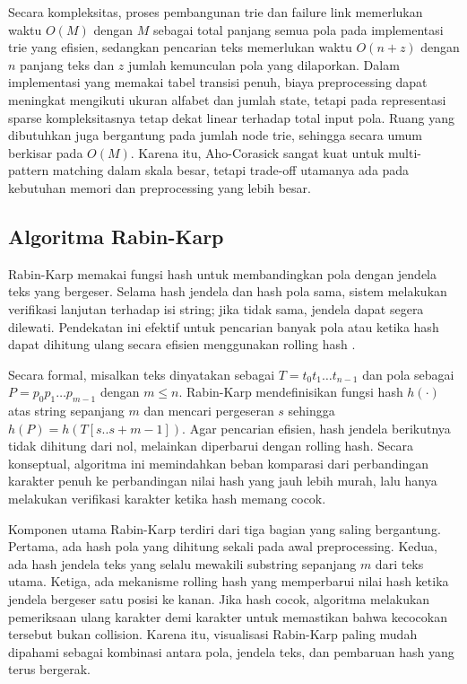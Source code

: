 Secara kompleksitas, proses pembangunan trie dan failure link memerlukan waktu $O(M)$ dengan $M$ sebagai total panjang semua pola pada implementasi trie yang efisien, sedangkan pencarian teks memerlukan waktu $O(n + z)$ dengan $n$ panjang teks dan $z$ jumlah kemunculan pola yang dilaporkan. Dalam implementasi yang memakai tabel transisi penuh, biaya preprocessing dapat meningkat mengikuti ukuran alfabet dan jumlah state, tetapi pada representasi sparse kompleksitasnya tetap dekat linear terhadap total input pola. Ruang yang dibutuhkan juga bergantung pada jumlah node trie, sehingga secara umum berkisar pada $O(M)$. Karena itu, Aho-Corasick sangat kuat untuk multi-pattern matching dalam skala besar, tetapi trade-off utamanya ada pada kebutuhan memori dan preprocessing yang lebih besar.

\subsection{Algoritma Rabin-Karp}

Rabin-Karp memakai fungsi hash untuk membandingkan pola dengan jendela teks yang bergeser. Selama hash jendela dan hash pola sama, sistem melakukan verifikasi lanjutan terhadap isi string; jika tidak sama, jendela dapat segera dilewati. Pendekatan ini efektif untuk pencarian banyak pola atau ketika hash dapat dihitung ulang secara efisien menggunakan rolling hash \cite{karp1987efficient}.

Secara formal, misalkan teks dinyatakan sebagai $T = t_0 t_1 \dots t_{n-1}$ dan pola sebagai $P = p_0 p_1 \dots p_{m-1}$ dengan $m \leq n$. Rabin-Karp mendefinisikan fungsi hash $h(\cdot)$ atas string sepanjang $m$ dan mencari pergeseran $s$ sehingga $h(P) = h(T[s..s+m-1])$. Agar pencarian efisien, hash jendela berikutnya tidak dihitung dari nol, melainkan diperbarui dengan rolling hash. Secara konseptual, algoritma ini memindahkan beban komparasi dari perbandingan karakter penuh ke perbandingan nilai hash yang jauh lebih murah, lalu hanya melakukan verifikasi karakter ketika hash memang cocok.

Komponen utama Rabin-Karp terdiri dari tiga bagian yang saling bergantung. Pertama, ada hash pola yang dihitung sekali pada awal preprocessing. Kedua, ada hash jendela teks yang selalu mewakili substring sepanjang $m$ dari teks utama. Ketiga, ada mekanisme rolling hash yang memperbarui nilai hash ketika jendela bergeser satu posisi ke kanan. Jika hash cocok, algoritma melakukan pemeriksaan ulang karakter demi karakter untuk memastikan bahwa kecocokan tersebut bukan collision. Karena itu, visualisasi Rabin-Karp paling mudah dipahami sebagai kombinasi antara pola, jendela teks, dan pembaruan hash yang terus bergerak.

